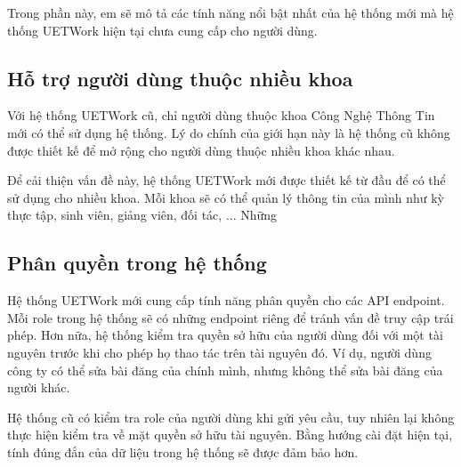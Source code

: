 \documentclass[./../main.tex]{subfiles}
\begin{document}
Trong phần này, em sẽ mô tả các tính năng nổi bật nhất của hệ thống mới
mà hệ thống UETWork hiện tại chưa cung cấp cho người dùng.

\hypertarget{hux1ed7-trux1ee3-ngux1b0ux1eddi-duxf9ng-thuux1ed9c-nhiux1ec1u-khoa}{%
\subsection{Hỗ trợ người dùng thuộc nhiều
khoa}\label{hux1ed7-trux1ee3-ngux1b0ux1eddi-duxf9ng-thuux1ed9c-nhiux1ec1u-khoa}}



Với hệ thống UETWork cũ, chỉ người dùng thuộc khoa Công Nghệ Thông Tin mới có thể sử dụng hệ thống. Lý do chính của giới hạn này là hệ thống cũ không được thiết kế để mở rộng cho người dùng thuộc nhiều khoa khác nhau.

Để cải thiện vấn đề này, hệ thống UETWork mới được thiết kế từ đầu để có thể sử dụng cho nhiều khoa. Mỗi khoa sẽ có thể quản lý thông tin của mình như kỳ thực tập, sinh viên, giảng viên, đối tác, ... Những 

\hypertarget{phuxe2n-quyux1ec1n-trong-hux1ec7-thux1ed1ng}{%
\subsection{Phân quyền trong hệ
thống}\label{phuxe2n-quyux1ec1n-trong-hux1ec7-thux1ed1ng}}

Hệ thống UETWork mới cung cấp tính năng phân quyền cho các API endpoint.
Mỗi role trong hệ thống sẽ có những endpoint riêng để tránh vấn đề truy
cập trái phép. Hơn nữa, hệ thống kiểm tra quyền sở hữu của người dùng
đối với một tài nguyên trước khi cho phép họ thao tác trên tài nguyên
đó. Ví dụ, người dùng công ty có thể sửa bài đăng của chính mình, nhưng
không thể sửa bài đăng của người khác.

Hệ thống cũ có kiểm tra role của người dùng khi gửi yêu cầu, tuy nhiên
lại không thực hiện kiểm tra về mặt quyền sở hữu tài nguyên. Bằng hướng
cài đặt hiện tại, tính đúng đắn của dữ liệu trong hệ thống sẽ được đảm
bảo hơn.
\end{document}

